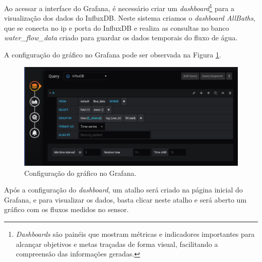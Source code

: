 Ao acessar a interface do Grafana, é necessário criar um \textit{dashboard}\footnote{\textit{Dashboards} são painéis que mostram métricas e indicadores importantes para alcançar objetivos e metas traçadas de forma visual, facilitando a compreensão das informações geradas.} para a visualização dos dados do InfluxDB. Neste sistema criamos o \textit{dashboard AllBaths}, que se conecta no ip e porta do InfluxDB e realiza as consultas no banco \textit{water\_flow\_data} criado para guardar os dados temporais do fluxo de água.

A configuração do gráfico no Grafana pode ser observada na Figura \ref{fig:grafanaconf}.

\begin{figure}[htbp]
	\centering
	\includegraphics[width=1\linewidth]{figuras/grafanaconf.png}
	\caption{Configuração do gráfico no Grafana.}
	\label{fig:grafanaconf}
\end{figure}

Após a configuração do \textit{dashboard}, um atalho será criado na página inicial do Grafana, e para visualizar os dados, basta clicar neste atalho e será aberto um gráfico com os fluxos medidos no sensor.

